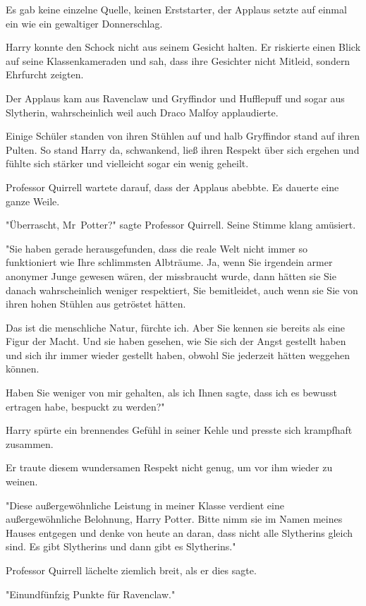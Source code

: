 {Es gab keine einzelne Quelle, keinen Erststarter, der Applaus setzte auf einmal ein wie ein gewaltiger Donnerschlag.

Harry konnte den Schock nicht aus seinem Gesicht halten. Er riskierte einen Blick auf seine Klassenkameraden und sah, dass ihre Gesichter nicht Mitleid, sondern Ehrfurcht zeigten.

Der Applaus kam aus Ravenclaw und Gryffindor und Hufflepuff und sogar aus Slytherin, wahrscheinlich weil auch Draco Malfoy applaudierte.

Einige Schüler standen von ihren Stühlen auf und halb Gryffindor stand auf ihren Pulten. So stand Harry da, schwankend, ließ ihren Respekt über sich ergehen und fühlte sich stärker und vielleicht sogar ein wenig geheilt.

Professor Quirrell wartete darauf, dass der Applaus abebbte. Es dauerte eine ganze Weile.

"Überrascht, Mr~Potter?" sagte Professor Quirrell. Seine Stimme klang amüsiert.

"Sie haben gerade herausgefunden, dass die reale Welt nicht immer so funktioniert wie Ihre schlimmsten Albträume. Ja, wenn Sie irgendein armer anonymer Junge gewesen wären, der missbraucht wurde, dann hätten sie Sie danach wahrscheinlich weniger respektiert, Sie bemitleidet, auch wenn sie Sie von ihren hohen Stühlen aus getröstet hätten.

Das ist die menschliche Natur, fürchte ich. Aber Sie kennen sie bereits als eine Figur der Macht. Und sie haben gesehen, wie Sie sich der Angst gestellt haben und sich ihr immer wieder gestellt haben, obwohl Sie jederzeit hätten weggehen können.

Haben Sie weniger von mir gehalten, als ich Ihnen sagte, dass ich es bewusst ertragen habe, bespuckt zu werden?"

Harry spürte ein brennendes Gefühl in seiner Kehle und presste sich krampfhaft zusammen.

Er traute diesem wundersamen Respekt nicht genug, um vor ihm wieder zu weinen.

"Diese außergewöhnliche Leistung in meiner Klasse verdient eine außergewöhnliche Belohnung, Harry Potter. Bitte nimm sie im Namen meines Hauses entgegen und denke von heute an daran, dass nicht alle Slytherins gleich sind. Es gibt Slytherins und dann gibt es Slytherins."

Professor Quirrell lächelte ziemlich breit, als er dies sagte.

"Einundfünfzig Punkte für Ravenclaw."

}
